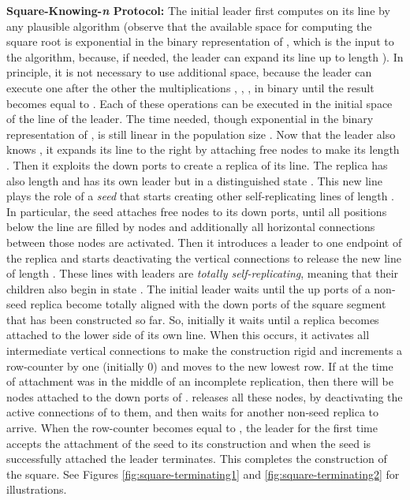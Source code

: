 \documentclass[oribibl, 11pt]{llncs}
\begin{document}
\noindent\textbf{Square-Knowing-\emph{n} Protocol:} The initial leader  first computes  on its line by any plausible algorithm (observe that the available space for computing the square root is exponential in the binary representation of , which is the input to the algorithm, because, if needed, the leader can expand its line up to length ). In principle, it is not necessary to use additional space, because the leader can execute one after the other the multiplications , , ,  in binary until the result becomes equal to . Each of these operations can be executed in the initial  space of the line of the leader. The time needed, though exponential in the binary representation of , is still linear in the population size . Now that the leader also knows , it expands its line to the right by attaching free nodes to make its length . Then it exploits the down ports to create a replica of its line. The replica has also length  and has its own leader but in a distinguished state . This new line plays the role of a \emph{seed} that starts creating other self-replicating lines of length . In particular, the seed attaches free nodes to its down ports, until all positions below the line are filled by nodes and additionally all horizontal connections between those nodes are activated. Then it introduces a leader  to one endpoint of the replica and starts deactivating the vertical connections to release the new line of length . These lines with  leaders are \emph{totally self-replicating}, meaning that their children also begin in state . The initial leader  waits until the up ports of a non-seed replica  become totally aligned with the down ports of the square segment that has been constructed so far. So, initially it waits until a replica becomes attached to the lower side of its own line. When this occurs, it activates all intermediate vertical connections to make the construction rigid and increments a row-counter by one (initially 0) and moves to the new lowest row. If at the time of attachment  was in the middle of an incomplete replication, then there will be nodes attached to the down ports of .  releases all these nodes, by deactivating the active connections of  to them, and then waits for another non-seed replica to arrive. When the row-counter becomes equal to , the leader for the first time accepts the attachment of the seed to its construction and when the seed is successfully attached the leader terminates. This completes the construction of the  square. See Figures \ref{fig:square-terminating1} and \ref{fig:square-terminating2} for illustrations.
\end{document}

